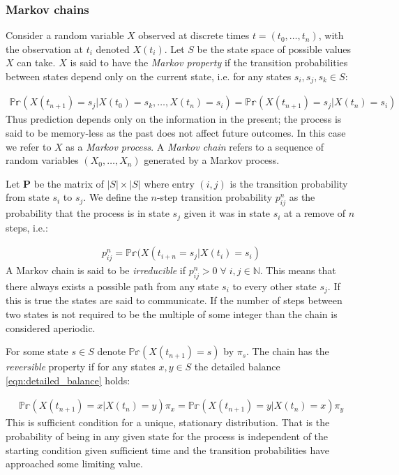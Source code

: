 \documentclass[12pt]{article} %
\begin{document}
\subsubsection{Markov chains}
Consider a random variable $X$ observed at discrete times $t = (t_0,\ldots,t_n)$, with the observation at $t_i$ denoted $X(t_i)$. Let $S$ be the state space of possible values $X$ can take. $X$ is said to have the \emph{Markov property} if the transition probabilities between states depend only on the current state, i.e. for any states $s_i, s_j, s_k \in S$:

\begin{align}
\mathbb{Pr}(X(t_{n+1}) = s_j | X(t_0) = s_k, \ldots, X(t_n) = s_i) = \mathbb{Pr}(X(t_{n+1}) = s_j | X(t_n) = s_i) 
\end{align}
Thus prediction depends only on the information in the present; the process is said to be memory-less as the past does not affect future outcomes. In this case we refer to $X$ as a \emph{Markov process}. A \emph{Markov chain} refers to a sequence of random variables $(X_0,\ldots,X_n)$ generated by a Markov process.

Let $\mathbf{P}$ be the matrix of $|S| \times |S|$ where entry $(i,j)$ is the transition probability from state $s_i$ to $s_j$. We define the $n$-step transition probability $p_{ij}^n$ as the probability that the process is in state $s_j$ given it was in state $s_i$ at a remove of $n$ steps, i.e.:

\begin{align}
p_{ij}^n = \mathbb{Pr}(X(t_{i+n} = s_j | X(t_i) = s_i)
\end{align}
A Markov chain is said to be \emph{irreducible} if $p_{ij}^n > 0 \; \forall \; i,j \in \mathbb{N}$. This means that there always exists a possible path from any state $s_i$ to every other state $s_j$. If this is true the states are said to communicate. If the number of steps between two states is not required to be the multiple of some integer than the chain is considered aperiodic.

For some state $s \in S$ denote $ \mathbb{Pr}(X(t_{n+1}) = s)$ by $\pi_s$. The chain has the \emph{reversible} property if for any states $x, y \in S$ the detailed balance \eqref{eqn:detailed_balance} holds:

\begin{align} \label{eqn:detailed_balance}
\mathbb{Pr}(X(t_{n+1}) = x | X(t_n) = y)  \pi_x  =  \mathbb{Pr}(X(t_{n+1}) = y | X(t_n) = x) \pi_y
\end{align}
This is sufficient condition for a unique, stationary distribution. That is the probability of being in any given state for the process is independent of the starting condition given sufficient time and the transition probabilities have approached some limiting value. 
\end{document}
